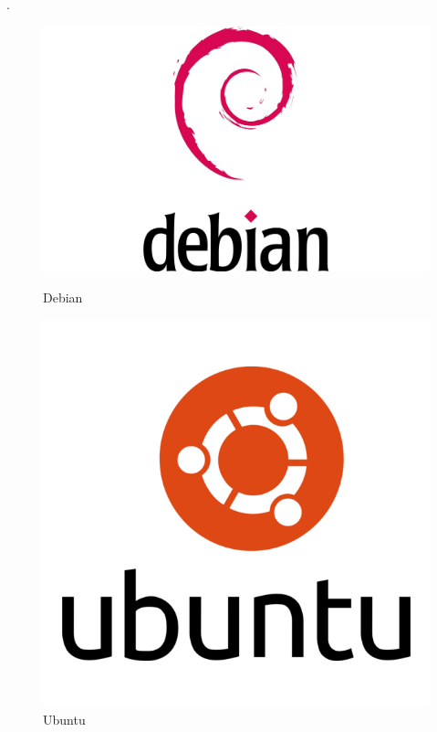 \begin{itemize}[leftmargin=*,nosep]
   .\begin{figure}[hbt!]
  \centering
  \begin{minipage}[b]{0.18\textwidth}
    \includegraphics[width=\textwidth]{images_pfe/debian.jpg}
    \caption{Debian}
  \end{minipage}\hfill
  \begin{minipage}[b]{0.18\textwidth}
    \includegraphics[width=\textwidth]{images_pfe/ubuntu.png}
    \caption{Ubuntu}
  \end{minipage}\hfill
  \begin{minipage}[b]{0.18\textwidth}

\end{minipage}
\end{figure}
\end{itemize}
